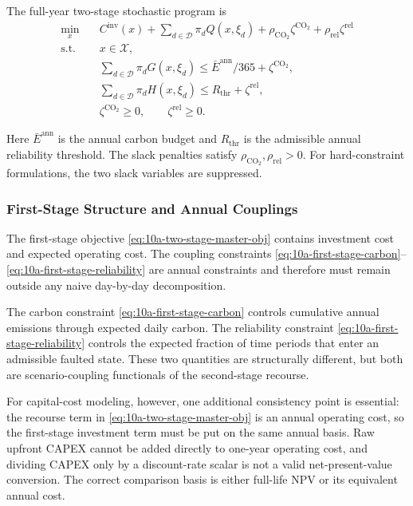 The full-year two-stage stochastic program is
\begin{align}
\min_{x} \quad & C^{\mathrm{inv}}(x) + \sum_{d\in\mathcal{D}} \pi_d Q(x,\xi_d) + \rho_{\mathrm{CO_2}}\zeta^{\mathrm{CO_2}} + \rho_{\mathrm{rel}}\zeta^{\mathrm{rel}}
\label{eq:10a-two-stage-master-obj}\\
\text{s.t.}\quad & x \in \mathcal{X},
\label{eq:10a-first-stage-set}\\
& \sum_{d\in\mathcal{D}} \pi_d G(x,\xi_d) \le \bar E^{\mathrm{ann}}/365 + \zeta^{\mathrm{CO_2}},
\label{eq:10a-first-stage-carbon}\\
& \sum_{d\in\mathcal{D}} \pi_d H(x,\xi_d) \le R_{\mathrm{thr}} + \zeta^{\mathrm{rel}},
\label{eq:10a-first-stage-reliability}\\
& \zeta^{\mathrm{CO_2}} \ge 0,\qquad \zeta^{\mathrm{rel}} \ge 0.
\label{eq:10a-first-stage-slacks}
\end{align}

Here \(\bar E^{\mathrm{ann}}\) is the annual carbon budget and \(R_{\mathrm{thr}}\) is the admissible annual reliability threshold. The slack penalties satisfy \(\rho_{\mathrm{CO_2}},\rho_{\mathrm{rel}}>0\). For hard-constraint formulations, the two slack variables are suppressed.

\subsubsection{First-Stage Structure and Annual Couplings}

The first-stage objective \eqref{eq:10a-two-stage-master-obj} contains investment cost and expected operating cost. The coupling constraints \eqref{eq:10a-first-stage-carbon}--\eqref{eq:10a-first-stage-reliability} are annual constraints and therefore must remain outside any naive day-by-day decomposition.

The carbon constraint \eqref{eq:10a-first-stage-carbon} controls cumulative annual emissions through expected daily carbon. The reliability constraint \eqref{eq:10a-first-stage-reliability} controls the expected fraction of time periods that enter an admissible faulted state. These two quantities are structurally different, but both are scenario-coupling functionals of the second-stage recourse.

For capital-cost modeling, however, one additional consistency point is essential: the recourse term in \eqref{eq:10a-two-stage-master-obj} is an annual operating cost, so the first-stage investment term must be put on the same annual basis. Raw upfront CAPEX cannot be added directly to one-year operating cost, and dividing CAPEX only by a discount-rate scalar is not a valid net-present-value conversion. The correct comparison basis is either full-life NPV or its equivalent annual cost.

